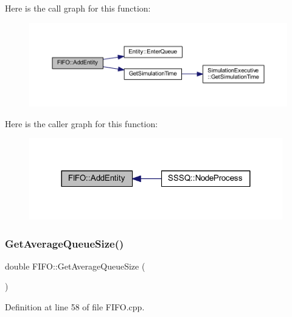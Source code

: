 Here is the call graph for this function\+:
\nopagebreak
\begin{figure}[H]
\begin{center}
\leavevmode
\includegraphics[width=350pt]{class_f_i_f_o_a7255ba93981ed0662bc4c26d9983dc9e_cgraph}
\end{center}
\end{figure}
Here is the caller graph for this function\+:
\nopagebreak
\begin{figure}[H]
\begin{center}
\leavevmode
\includegraphics[width=312pt]{class_f_i_f_o_a7255ba93981ed0662bc4c26d9983dc9e_icgraph}
\end{center}
\end{figure}
\mbox{\label{class_f_i_f_o_a739f5e90efc37fcea0f66e5548132d5f}} 
\subsubsection{\texorpdfstring{Get\+Average\+Queue\+Size()}{GetAverageQueueSize()}}
{\footnotesize\ttfamily double F\+I\+F\+O\+::\+Get\+Average\+Queue\+Size (\begin{DoxyParamCaption}{ }\end{DoxyParamCaption})}



Definition at line 58 of file F\+I\+F\+O.\+cpp.

